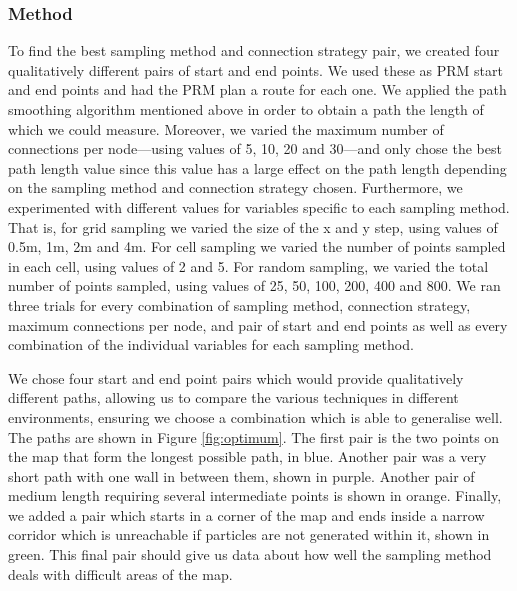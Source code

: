 \documentclass[conference]{IEEEtran}
\begin{document}
\subsubsection{Method}
To find the best sampling method and connection strategy pair, we created four qualitatively different pairs of start and end points. We used these as PRM start and end points and had the PRM plan a route for each one. We applied the path smoothing algorithm mentioned above in order to obtain a path the length of which we could measure. Moreover, we varied the maximum number of connections per node---using values of 5, 10, 20 and 30---and only chose the best path length value since this value has a large effect on the path length depending on the sampling method and connection strategy chosen. Furthermore, we experimented with different values for variables specific to each sampling method. That is, for grid sampling we varied the size of the x and y step, using values of 0.5m, 1m, 2m and 4m. For cell sampling we varied the number of points sampled in each cell, using values of 2 and 5. For random sampling, we varied the total number of points sampled, using values of 25, 50, 100, 200, 400 and 800. We ran three trials for every combination of sampling method, connection strategy, maximum connections per node, and pair of start and end points as well as every combination of the individual variables for each sampling method.

We chose four start and end point pairs which would provide qualitatively different paths, allowing us to compare the various techniques in different environments, ensuring we choose a combination which is able to generalise well. The paths are shown in Figure \ref{fig:optimum}. The first pair is the two points on the map that form the longest possible path, in blue. Another pair was a very short path with one wall in between them, shown in purple. Another pair of medium length requiring several intermediate points is shown in orange. Finally, we added a pair which starts in a corner of the map and ends inside a narrow corridor which is unreachable if particles are not generated within it, shown in green. This final pair should give us data about how well the sampling method deals with difficult areas of the map.
\end{document}
